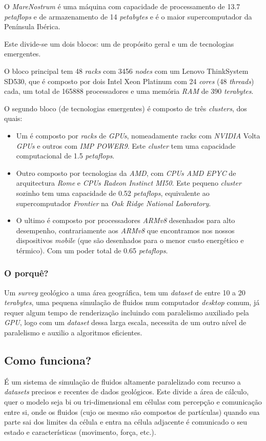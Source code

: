 \documentclass{article}
\begin{document}
O \textit{MareNostrum} é uma máquina com capacidade de processamento de 13.7 \textit{petaflops} e de armazenamento de 14 \textit{petabytes} e é o maior supercomputador da Península Ibérica.

Este divide-se um dois blocos: um de propósito geral e um de tecnologias emergentes.

O bloco principal tem 48 \textit{racks} com 3456 \textit{nodes} com um Lenovo ThinkSystem SD530, que é composto por dois Intel Xeon Platinum com 24 \textit{cores} (48 \textit{threads}) cada, um total de 165888 processadores e uma memória \textit{RAM} de 390 \textit{terabytes}.

O segundo bloco (de tecnologias emergentes) é composto de três \textit{clusters}, dos quais:
\begin{itemize}
	\item Um é composto por \textit{racks} de \textit{GPUs}, nomeadamente racks com \textit{NVIDIA} Volta \textit{GPUs} e outros com \textit{IMP POWER9}. Este \textit{cluster} tem uma capacidade computacional de 1.5 \textit{petaflops}.
	\item Outro composto por tecnologias da \textit{AMD}, com \textit{CPUs AMD EPYC} de arquitectura \textit{Rome} e \textit{CPUs Radeon Instinct MI50}. Este pequeno \textit{cluster} sozinho tem uma capacidade de 0.52 \textit{petaflops}, equivalente ao supercomputador \textit{Frontier} na \textit{Oak Ridge National Laboratory}.
	\item O ultimo é composto por processadores \textit{ARMv8} desenhados para alto desempenho, contrariamente aos \textit{ARMv8} que encontramos nos nossos dispositivos \textit{mobile} (que são desenhados para o menor custo energético e térmico). Com um poder total de 0.65 \textit{petaflops}.
\end{itemize}

\subsubsection{O porquê?}
Um \textit{survey} geológico a uma área geográfica, tem um \textit{dataset} de entre 10 a 20 \textit{terabytes}, uma pequena simulação de fluidos num computador \textit{desktop} comum, já requer algum tempo de renderização incluindo com paralelismo auxiliado pela \textit{GPU}, logo com um \textit{dataset} dessa larga escala, necessita de um outro nível de paralelismo e auxilio a algoritmos eficientes.

\subsection{Como funciona?}
É um sistema de simulação de fluidos altamente paralelizado com recurso a \textit{datasets} precisos e recentes de dados geológicos. Este divide a área de cálculo, quer o modelo seja bi ou tri-dimensional em células com percepção e comunicação entre si, onde os fluidos (cujo os mesmo são compostos de partículas) quando sua parte sai dos limites da célula e entra na célula adjacente é comunicado o seu estado e características (movimento, força, etc.).
\end{document}
